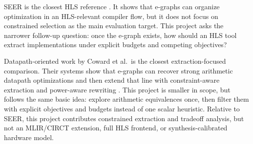 \documentclass[sigplan,10pt,review]{acmart}
\begin{document}
SEER is the closest HLS reference \cite{cheng2024seer}. It shows that e-graphs can organize optimization in an HLS-relevant compiler flow, but it does not focus on constrained selection as the main evaluation target. This project asks the narrower follow-up question: once the e-graph exists, how should an HLS tool extract implementations under explicit budgets and competing objectives?

Datapath-oriented work by Coward et al.\ is the closest extraction-focused comparison. Their systems show that e-graphs can recover strong arithmetic datapath optimizations and then extend that line with constraint-aware extraction and power-aware rewriting \cite{coward2022automatic,coward2023constraint,coward2024power}. This project is smaller in scope, but follows the same basic idea: explore arithmetic equivalences once, then filter them with explicit objectives and budgets instead of one scalar heuristic. Relative to SEER, this project contributes constrained extraction and tradeoff analysis, but not an MLIR/CIRCT extension, full HLS frontend, or synthesis-calibrated hardware model.
\end{document}
